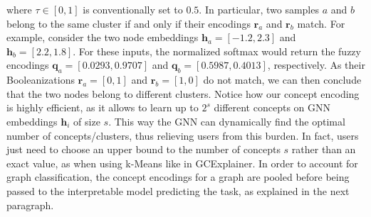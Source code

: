 \documentclass[withindex,glossary]{cam-thesis}
\theoremstyle{plain}
\theoremstyle{definition}
\theoremstyle{remark}
\begin{document}
where $\tau \in [0,1]$ is conventionally set to $0.5$.
In particular, two samples $a$ and $b$ belong to the same cluster if and only if their encodings $\mathbf{r}_a$ and $\mathbf{r}_b$ match.  For example, consider the two node embeddings $\mathbf{h}_a = [-1.2, 2.3]$ and $\mathbf{h}_b = [2.2, 1.8]$. For these inputs, the normalized softmax would return the fuzzy encodings $\mathbf{q}_a = [0.0293, 0.9707]$ and $\mathbf{q}_b = [0.5987, 0.4013]$, respectively. As their Booleanizations $\mathbf{r}_a = [0, 1]$ and $\mathbf{r}_b = [1, 0]$ do not match, we can then conclude that the two nodes belong to different clusters. Notice how our concept encoding is highly efficient, as it allows to learn up to $2^s$ different concepts on GNN embeddings $\mathbf{h}_i$ of size $s$. This way the GNN can dynamically find the optimal number of concepts/clusters, thus relieving users from this burden. In fact, users just need to choose an upper bound to the number of concepts $s$ rather than an exact value, as when using k-Means like in GCExplainer. In order to account for graph classification, the concept encodings for a graph are pooled before being passed to the interpretable model predicting the task, as explained in the next paragraph.
\end{document}
